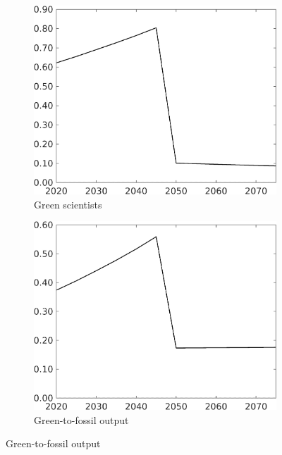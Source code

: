 \begin{figure}[h!!!]
\begin{subfigure}{0.32\textwidth}
	\end{subfigure}
	\begin{subfigure}{0.32\textwidth}
		\caption{Green scientists}
		\includegraphics[width=1\textwidth]{../../codding_model/own_basedOnFried/optimalPol_010922_revision/figures/all_13Sept22_Tplus30/sg_OPT_COMPtaulPer_regime4_spillover0_knspil1_noskill0_sep0_xgrowth0_PV1_etaa0.79.png}
	\end{subfigure}
	\begin{subfigure}{0.32\textwidth}
		\caption{Green-to-fossil output}
		\includegraphics[width=1\textwidth]{../../codding_model/own_basedOnFried/optimalPol_010922_revision/figures/all_13Sept22_Tplus30/GFF_OPT_COMPtaulPer_regime4_spillover0_knspil1_noskill0_sep0_xgrowth0_PV1_etaa0.79.png}

\end{subfigure}
\end{figure}
